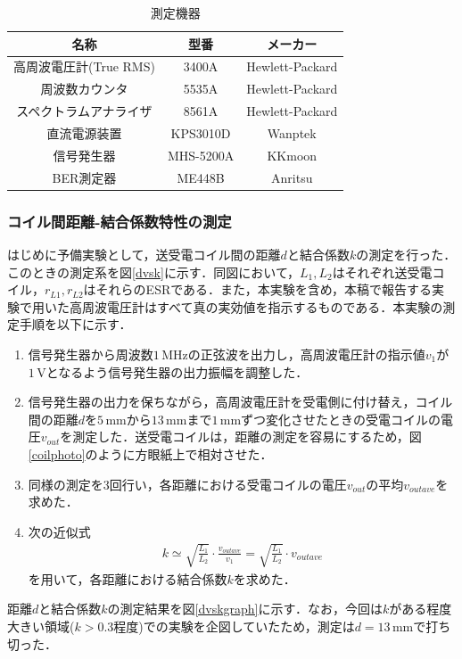 \begin{table}[h]
\centering
\caption{測定機器}
\begin{tabular}{c|c|c}
\hline
\multicolumn{1}{c|}{名称} & \multicolumn{1}{c|}{型番} & \multicolumn{1}{c}{メーカー} \\ \hline
高周波電圧計(True RMS) & 3400A & Hewlett-Packard \\ \hline
周波数カウンタ & 5535A & Hewlett-Packard \\ \hline
スペクトラムアナライザ & 8561A & Hewlett-Packard \\ \hline
直流電源装置 & KPS3010D & Wanptek\\ \hline
信号発生器 & MHS-5200A & KKmoon \\ \hline
BER測定器 & ME448B & Anritsu \\ \hline
\end{tabular}
\end{table}

\subsubsection{コイル間距離-結合係数特性の測定}
はじめに予備実験として，送受電コイル間の距離$d$と結合係数$k$の測定を行った．このときの測定系を図\ref{dvsk}に示す．同図において，$L_1, L_2$はそれぞれ送受電コイル，$r_{L1},r_{L2}$はそれらのESRである．また，本実験を含め，本稿で報告する実験で用いた高周波電圧計はすべて真の実効値を指示するものである．本実験の測定手順を以下に示す．

\begin{enumerate}
  \item 信号発生器から周波数$1 \, \mathrm{MHz}$の正弦波を出力し，高周波電圧計の指示値$v_1$が$1 \, \mathrm{V}$となるよう信号発生器の出力振幅を調整した．
  \item 信号発生器の出力を保ちながら，高周波電圧計を受電側に付け替え，コイル間の距離$d$を$5 \, \mathrm{mm}$から$13 \, \mathrm{mm}$まで$1 \, \mathrm{mm}$ずつ変化させたときの受電コイルの電圧$v_{out}$を測定した．送受電コイルは，距離の測定を容易にするため，図\ref{coilphoto}のように方眼紙上で相対させた．
  \item 同様の測定を3回行い，各距離における受電コイルの電圧$v_{out}$の平均$v_{outave}$を求めた．
  \item 次の近似式
  \begin{align}
	k \simeq \sqrt{\frac{L_1}{L_2}} \cdot \frac{v_{outave}}{v_1} =\sqrt{\frac{L_1}{L_2}} \cdot v_{outave}
  \end{align}
を用いて，各距離における結合係数$k$を求めた．
\end{enumerate}
距離$d$と結合係数$k$の測定結果を図\ref{dvskgraph}に示す．なお，今回は$k$がある程度大きい領域($k>0.3$程度)での実験を企図していたため，測定は$d=13 \, \mathrm{mm}$で打ち切った．

